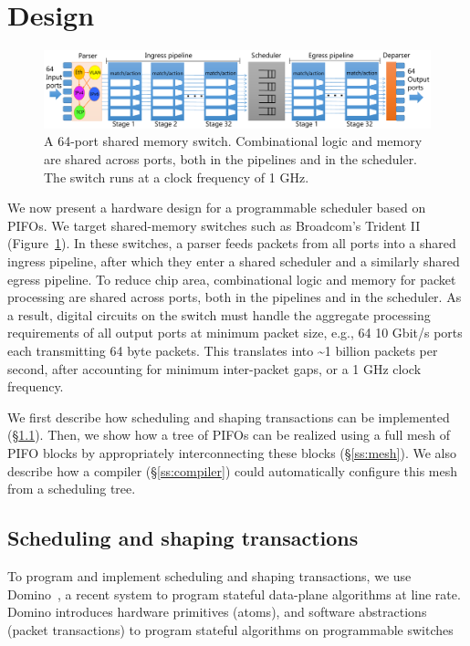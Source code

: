 \section{Design}
\label{s:design}

\begin{figure}
  \centering
  \includegraphics[width=\textwidth]{pifo_switch_pipeline.pdf}
  \caption{A 64-port shared memory switch.  Combinational logic and memory are
  shared across ports, both in the pipelines and in the scheduler. The switch
  runs at a clock frequency of 1 GHz.}
  \label{fig:switch}
\end{figure}

We now present a hardware design for a programmable scheduler based on PIFOs.
We target shared-memory switches such as Broadcom's Trident II~\cite{trident2}
(Figure~\ref{fig:switch}). In these switches, a parser feeds packets from all
ports into a shared ingress pipeline, after which they enter a shared scheduler
and a similarly shared egress pipeline. To reduce chip area, combinational
logic and memory for packet processing are shared across ports, both in the
pipelines and in the scheduler.  As a result, digital circuits on the switch
must handle the aggregate processing requirements of all output ports at
minimum packet size, e.g., 64 10 Gbit/s ports each transmitting 64 byte
packets. This translates into \textasciitilde 1 billion packets per second,
after accounting for minimum inter-packet gaps, or a 1 GHz clock
frequency.

We first describe how scheduling and shaping transactions can be implemented
(\S\ref{ss:transactions}). Then, we show how a tree of PIFOs can be realized
using a full mesh of PIFO blocks by appropriately interconnecting these blocks
(\S\ref{ss:mesh}). We also describe how a compiler (\S\ref{ss:compiler}) could
automatically configure this mesh from a scheduling tree.

\subsection{Scheduling and shaping transactions}
\label{ss:transactions}

To program and implement scheduling and shaping transactions, we use
Domino~\cite{domino_sigcomm}, a recent system to program stateful
data-plane algorithms at line rate. Domino introduces hardware
primitives (atoms), and software abstractions (packet transactions) to
program stateful algorithms on programmable switches~\cite{tofino, flexpipe,
xpliant, rmt}


